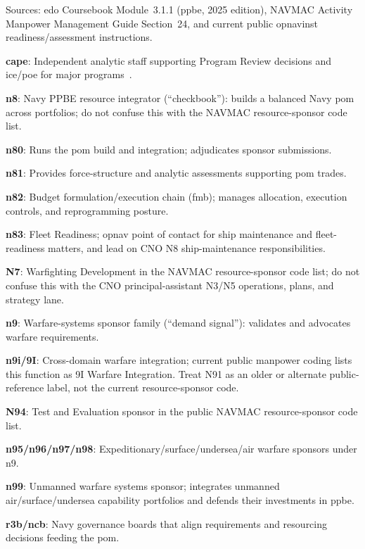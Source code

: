 \documentclass[../main.tex]{subfiles}
\begin{document}
\begin{description}[style=nextline, labelsep=0.5em, font=\bfseries]
  \item[\textbf{PPBE resource sponsors and integrators.}]
        Sources: \ac{edo} Coursebook Module~3.1.1 (\ac{ppbe}, 2025 edition), NAVMAC Activity Manpower Management Guide Section~24, and current public \ac{opnavinst} readiness/assessment instructions.
        \begin{description}
          \item \textbf{\ac{cape}}: Independent analytic staff supporting Program Review decisions and \ac{ice}/\ac{poe} for major programs~\autocite{USC-139a-CAPE,edo-3-1-1-ppbe-2025}.
          \item \textbf{\ac{n8}}: Navy PPBE resource integrator (``checkbook''): builds a balanced Navy \ac{pom} across portfolios; do not confuse this with the NAVMAC resource-sponsor code list.
          \item \textbf{\ac{n80}}: Runs the \ac{pom} build and integration; adjudicates sponsor submissions.
          \item \textbf{\ac{n81}}: Provides force-structure and analytic assessments supporting \ac{pom} trades.
          \item \textbf{\ac{n82}}: Budget formulation/execution chain (\ac*{fmb}); manages allocation, execution controls, and reprogramming posture.
          \item \textbf{\ac{n83}}: Fleet Readiness; \ac{opnav} point of contact for ship maintenance and fleet-readiness matters, and lead on CNO N8 ship-maintenance responsibilities.
          \item \textbf{N7}: Warfighting Development in the NAVMAC resource-sponsor code list; do not confuse this with the CNO principal-assistant N3/N5 operations, plans, and strategy lane.
          \item \textbf{\ac{n9}}: Warfare-systems sponsor family (``demand signal''): validates and advocates warfare requirements.
          \item \textbf{\ac{n9i}/9I}: Cross-domain warfare integration; current public manpower coding lists this function as 9I Warfare Integration. Treat N91 as an older or alternate public-reference label, not the current resource-sponsor code.
          \item \textbf{N94}: Test and Evaluation sponsor in the public NAVMAC resource-sponsor code list.
          \item \textbf{\ac{n95}/\ac{n96}/\ac{n97}/\ac{n98}}: Expeditionary/surface/undersea/air warfare sponsors under \ac{n9}.
          \item \textbf{\ac{n99}}: Unmanned warfare systems sponsor; integrates unmanned air/surface/undersea capability portfolios and defends their investments in \ac{ppbe}.
          \item \textbf{\ac{r3b}/\ac{ncb}}: Navy governance boards that align requirements and resourcing decisions feeding the \ac{pom}.
        \end{description}


\end{description}
\end{document}
